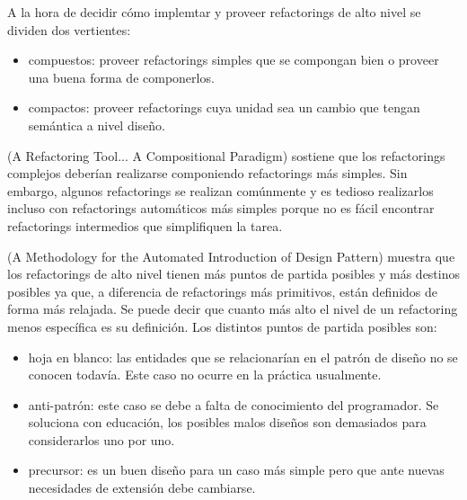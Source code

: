 A la hora de decidir cómo implemtar y proveer refactorings de alto nivel se dividen dos vertientes:

\begin{itemize}
    \item compuestos: proveer refactorings simples que se compongan bien o proveer una buena forma
    de componerlos.
    \item compactos: proveer refactorings cuya unidad sea un cambio que tengan semántica a nivel
    diseño.
\end{itemize}

(A Refactoring Tool... A Compositional Paradigm) sostiene que los refactorings complejos deberían
realizarse componiendo refactorings más simples. Sin embargo, algunos refactorings se realizan
comúnmente y es tedioso realizarlos incluso con refactorings automáticos más simples porque no es
fácil encontrar refactorings intermedios que simplifiquen la tarea. 

(A Methodology for the Automated Introduction of Design Pattern) muestra que los refactorings de alto nivel
tienen más puntos de partida posibles y más destinos posibles ya que, a diferencia de refactorings
más primitivos, están definidos de forma más relajada. Se puede decir que cuanto más alto el nivel
de un refactoring menos específica es su definición. Los distintos puntos de partida posibles son: 

\begin{itemize}
    \item hoja en blanco: las entidades que se relacionarían en el patrón de diseño no se conocen
    todavía. Este caso no ocurre en la práctica usualmente.
    \item anti-patrón: este caso se debe a falta de conocimiento del programador. Se soluciona con
    educación, los posibles malos diseños son demasiados para considerarlos uno por uno.
    \item precursor: es un buen diseño para un caso más simple pero que ante nuevas necesidades de
    extensión debe cambiarse.
\end{itemize}



